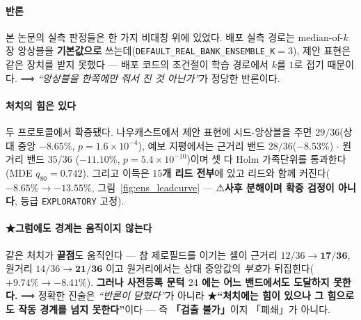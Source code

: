 \documentclass[11pt]{report}
\numberwithin{equation}{chapter}
\numberwithin{figure}{chapter}
\numberwithin{table}{chapter}
\begin{document}

\paragraph{반론}
본 논문의 실측 판정들은 한 가지 비대칭 위에 있었다. 배포 실측 경로는 median-of-$k$
장 앙상블을 \textbf{기본값으로} 쓰는데(\texttt{DEFAULT\_REAL\_BANK\_ENSEMBLE\_K}$=3$),
제안 표현은 같은 장치를 받지 못했다 --- 배포 코드의 조건절이 학습 경로에서 $k$를 $1$로
접기 때문이다. ⟹ \emph{``앙상블을 한쪽에만 줘서 진 것 아닌가''}가 정당한 반론이다.

\paragraph{처치의 힘은 있다}
두 프로토콜에서 확증됐다. 나우캐스트에서 제안 표현에 시드-앙상블을 주면
\textbf{$29/36$}(상대 중앙 $-8.65\%$, $p = 1.6\times10^{-4}$), 예보 지평에서는
근거리 밴드 \textbf{$28/36$}($-8.53\%$) $\cdot$ 원거리 밴드 \textbf{$35/36$}
($-11.10\%$, $p = 5.4\times10^{-10}$)이며 셋 다 Holm 가족단위를 통과한다
(MDE $q_{80} = 0.742$). 그리고 이득은 \textbf{$15$개 리드 전부}에 있고 리드와 함께
커진다($-8.65\% \to -13.55\%$, 그림~\ref{fig:ens_leadcurve} ---
⚠\textbf{사후 분해이며 확증 검정이 아니다}, 등급 \texttt{EXPLORATORY} 고정).

\paragraph{★그럼에도 경계는 움직이지 않는다}
같은 처치가 \textbf{끝점}도 움직인다 --- 참 제로필드를 이기는 셀이 근거리
$12/36 \to \mathbf{17/36}$, 원거리 $14/36 \to \mathbf{21/36}$ 이고 원거리에서는 상대
중앙값의 \emph{부호}가 뒤집힌다($+9.74\% \to -8.41\%$). \textbf{그러나 사전등록 문턱
$24$ 에는 어느 밴드에서도 도달하지 못한다.} ⟹ 정확한 진술은
\emph{``반론이 닫혔다''}가 아니라 ★\textbf{``처치에는 힘이 있으나 그 힘으로도 작동
경계를 넘지 못한다''}이다 --- 즉 \textbf{「검출 불가」}이지 「폐쇄」가 아니다.
\end{document}
